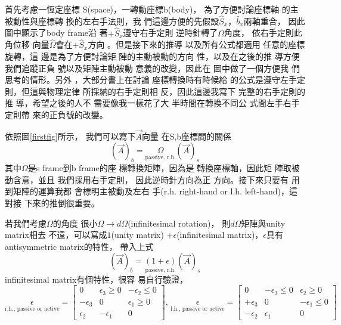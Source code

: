 \documentclass[12pt,a4paper]{article}
\begin{document}
首先考慮一恆定座標%
S(space)，一轉動座標b(body)，%
為了方便討論座標軸%
的主被動性與座標轉%
換的左右手法則，我%
們這邊方便的先假設$%
\hat{S}_{x}， \hat{b}_{x}$兩軸重合，%
因此圖中顯示了body frame沿%
著$+\hat{S}_{x}$遵守右手定則%
逆時針轉了$\Omega $角度，%
依右手定則此角位移%
向量$\hat{\Omega}$會在$+\hat{S}_{x}$方向%
。但是接下來的推導%
以及所有公式都適用%
任意的座標旋轉，這%
邊是為了方便討論矩%
陣的主動被動的方向%
性，以及在之後的推%
導方便我們追蹤正負%
號以及矩陣主動被動%
意義的改變，因此在%
圖中做了一個方便我%
們思考的情形。另外%
，大部分書上在討論%
座標轉換時有時候給%
的公式是遵守左手定%
則，但這與物理定律%
所採納的右手定則相%
反，因此這邊我寫下%
完整的右手定則的推%
導，希望之後的人不%
需要像我一樣花了大%
半時間在轉換不同公%
式間左手右手定則帶%
來的正負號的改變。

\bigskip 依照圖\ref{firstfig}所示，%
我們可以寫下$\vec{A}$向量%
在S,b座標間的關係%
\begin{equation*}
\left( \vec{A}\right) _{b}=\underset{\text{passive, r.h.}}{\Omega }\left( 
\vec{A}\right) _{s}
\end{equation*}%
其中$\Omega $是s frame到b frame的座%
標轉換矩陣，因為是%
轉換座標軸，因此矩%
陣取被動含意，並且%
我們採用右手定則，%
因此逆時針方向為正%
方向。接下來只要有%
用到矩陣的運算我都%
會標明主被動及左右%
手(r.h. right-hand or l.h. left-hand)，這對接%
下來的推倒很重要。

若我們考慮$\Omega $的角度%
很小$\Omega \rightarrow d\Omega $(infinitesimal rotation)，%
則$d\Omega $矩陣與unity matrix相去%
不遠，可以寫成$1$(unity matrix) +$%
\epsilon $(infinitesimal matrix)，$\epsilon $具有%
antisymmetric matrix的特性\cite[p. 169]{goldstein}，%
帶入上式%
\begin{equation*}
\left( \vec{A}\right) _{b}=\underset{\text{passive, r.h.}}{\left( 1+\epsilon
\right) }\left( \vec{A}\right) _{s}
\end{equation*}%
infinitesimal matrix有個特性，很容%
易自行驗證，%
\begin{equation*}
\underset{\text{r.h., passive or active}}{\epsilon }=\left[ 
\begin{array}{ccc}
0 & \epsilon _{3}\geq 0 & -\epsilon _{2}\leq 0 \\ 
-\epsilon _{3} & 0 & \epsilon _{1}\geq 0 \\ 
\epsilon _{2} & -\epsilon _{1} & 0%
\end{array}%
\right] \text{, }\underset{\text{l.h., passive or active}}{\epsilon }=\left[ 
\begin{array}{ccc}
0 & -\epsilon _{3}\leq 0 & \epsilon _{2}\geq 0 \\ 
+\epsilon _{3} & 0 & -\epsilon _{1}\leq 0 \\ 
-\epsilon _{2} & \epsilon _{1} & 0%
\end{array}%
\right]
\end{equation*}
\end{document}
